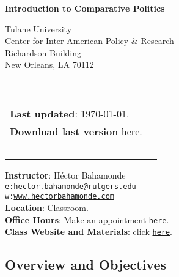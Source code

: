 \documentclass[letterpaper]{article}
\def\name{Introduction to Comparative Politics}
\begin{document}

\centerline{\huge \bf \name}

\vspace{0.25in}

\begin{minipage}{0.45\linewidth}
  Tulane University \\
  Center for Inter-American Policy \& Research \\
  Richardson Building \\
  New Orleans, LA 70112\\
  \\
  \\

\end{minipage}
\hspace{4cm}\begin{minipage}{0.45\linewidth}
  \begin{tabular}{ll}
{\bf Last updated}: \today. \\
 {\bf Download last version} \href{https://github.com/hbahamonde/Comparative_Politics_UGRAD/raw/master/Bahamonde_Comparative_Politics_Syllabus_UGRAD.pdf}{here}.\\
   {\bf {\color{red}{\scriptsize Not intended as a definitive version}}} %
    \\
    \\
    \\
    \\
    \\
  \end{tabular}
\end{minipage}

\vspace{-5mm}
{\bf Instructor}: H\'ector Bahamonde\\
\texttt{e:}\href{mailto:hector.bahamonde@rutgers.edu}{\texttt{hector.bahamonde@rutgers.edu}}\\
\texttt{w:}\href{http://www.hectorbahamonde.com}{\texttt{www.hectorbahamonde.com}}\\
{\bf Location}: Classroom.\\
{\bf Office Hours}: Make an appointment \href{https://calendly.com/bahamonde/officehours}{\texttt{here}}.\\
{\bf Class Website and Materials}: click \href{https://github.com/hbahamonde/Comparative_Politics_UGRAD}{\texttt{here}}.

\subsection*{Overview and Objectives}
\end{document}
